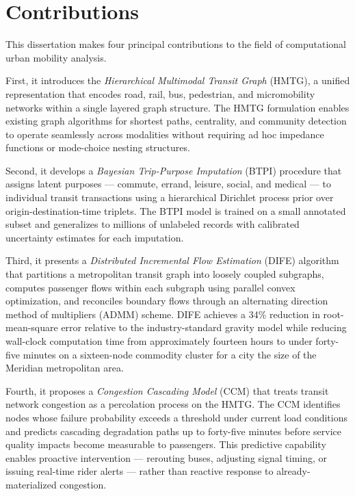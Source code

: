\section{Contributions}

This dissertation makes four principal contributions to the field of computational urban mobility analysis.

First, it introduces the \emph{Hierarchical Multimodal Transit Graph} (HMTG), a unified representation that encodes road, rail, bus, pedestrian, and micromobility networks within a single layered graph structure. The HMTG formulation enables existing graph algorithms for shortest paths, centrality, and community detection to operate seamlessly across modalities without requiring ad hoc impedance functions or mode-choice nesting structures.

Second, it develops a \emph{Bayesian Trip-Purpose Imputation} (BTPI) procedure that assigns latent purposes --- commute, errand, leisure, social, and medical --- to individual transit transactions using a hierarchical Dirichlet process prior over origin-destination-time triplets. The BTPI model is trained on a small annotated subset and generalizes to millions of unlabeled records with calibrated uncertainty estimates for each imputation.

Third, it presents a \emph{Distributed Incremental Flow Estimation} (DIFE) algorithm that partitions a metropolitan transit graph into loosely coupled subgraphs, computes passenger flows within each subgraph using parallel convex optimization, and reconciles boundary flows through an alternating direction method of multipliers (ADMM) scheme. DIFE achieves a 34\% reduction in root-mean-square error relative to the industry-standard gravity model while reducing wall-clock computation time from approximately fourteen hours to under forty-five minutes on a sixteen-node commodity cluster for a city the size of the Meridian metropolitan area.

Fourth, it proposes a \emph{Congestion Cascading Model} (CCM) that treats transit network congestion as a percolation process on the HMTG. The CCM identifies nodes whose failure probability exceeds a threshold under current load conditions and predicts cascading degradation paths up to forty-five minutes before service quality impacts become measurable to passengers. This predictive capability enables proactive intervention --- rerouting buses, adjusting signal timing, or issuing real-time rider alerts --- rather than reactive response to already-materialized congestion.
